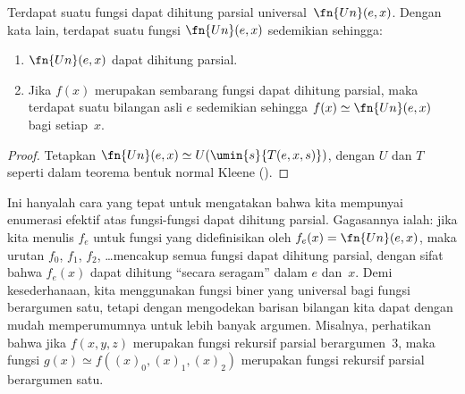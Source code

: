 \documentclass[../../../include/open-logic-section]{subfiles}
\begin{document}

\begin{thm}
Terdapat suatu fungsi dapat dihitung parsial universal~$\fn{Un}(e,x)$. Dengan
kata lain, terdapat suatu fungsi $\fn{Un}(e,x)$ sedemikian sehingga:
\begin{enumerate}
\item $\fn{Un}(e,x)$ dapat dihitung parsial.
\item Jika $f(x)$ merupakan sembarang fungsi dapat dihitung parsial, maka
  terdapat suatu bilangan asli $e$ sedemikian sehingga
  $f(x) \simeq \fn{Un}(e,x)$ bagi setiap~$x$.
\end{enumerate}
\end{thm}

\begin{proof}
Tetapkan $\fn{Un}(e,x) \simeq U(\umin{s}{T(e,x,s)})$, dengan $U$ dan $T$
seperti dalam teorema bentuk normal Kleene
().
\end{proof}

\begin{explain}
Ini hanyalah cara yang tepat untuk mengatakan bahwa kita mempunyai enumerasi
efektif atas fungsi-fungsi dapat dihitung parsial. Gagasannya ialah: jika kita
menulis $f_e$ untuk fungsi yang didefinisikan oleh
$f_e(x) = \fn{Un}(e,x)$, maka urutan $f_0$, $f_1$, $f_2$, \dots mencakup semua
fungsi dapat dihitung parsial, dengan sifat bahwa $f_e(x)$ dapat dihitung
``secara seragam'' dalam $e$ dan~$x$. Demi kesederhanaan, kita menggunakan
fungsi biner yang universal bagi fungsi berargumen satu, tetapi dengan
mengodekan barisan bilangan kita dapat dengan mudah memperumumnya untuk lebih
banyak argumen. Misalnya, perhatikan bahwa jika $f(x,y,z)$ merupakan fungsi
rekursif parsial berargumen~$3$, maka fungsi
$g(x) \simeq f((x)_0, (x)_1, (x)_2)$ merupakan fungsi rekursif parsial
berargumen satu.
\end{explain}
\end{document}

